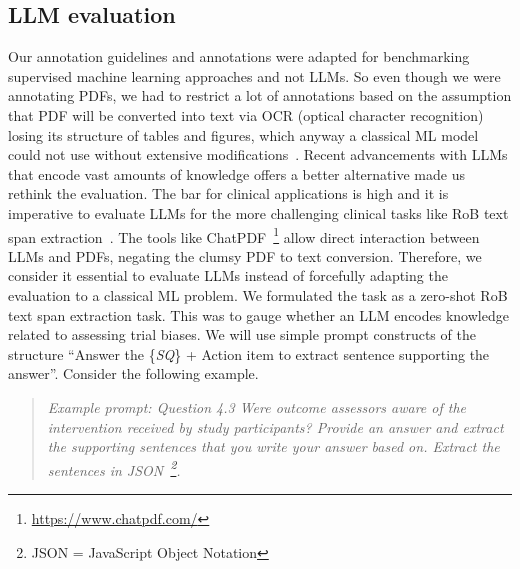 \documentclass[sn-mathphys,Numbered]{sn-jnl}%
\theoremstyle{thmstyleone}%
\theoremstyle{thmstyletwo}%
\theoremstyle{thmstylethree}%
\begin{document}
\subsection{LLM evaluation}
\label{method:llm}
%
Our annotation guidelines and annotations were adapted for benchmarking supervised machine learning approaches and not LLMs.
So even though we were annotating PDFs, we had to restrict a lot of annotations based on the assumption that PDF will be converted into text via OCR (optical character recognition) losing its structure of tables and figures, which anyway a classical ML model could not use without extensive modifications~\cite{li2019figure,li2023uttsr}.
Recent advancements with LLMs that encode vast amounts of knowledge offers a better alternative made us rethink the evaluation.
The bar for clinical applications is high and it is imperative to evaluate LLMs for the more challenging clinical tasks like RoB text span extraction~\cite{singhal2023large}.
The tools like ChatPDF~\footnote{\url{https://www.chatpdf.com/}} allow direct interaction between LLMs and PDFs, negating the clumsy PDF to text conversion.
Therefore, we consider it essential to evaluate LLMs instead of forcefully adapting the evaluation to a classical ML problem.
We formulated the task as a zero-shot RoB text span extraction task.
This was to gauge whether an LLM encodes knowledge related to assessing trial biases.
We will use simple prompt constructs of the structure ``Answer the \{\textit{SQ}\} + Action item to extract sentence supporting the answer''.
Consider the following example.

\begin{quote}
\itshape Example prompt: Question 4.3 Were outcome assessors aware of the intervention received by study participants? Provide an answer and extract the supporting sentences that you write your answer based on. Extract the sentences in JSON~\footnote{JSON = JavaScript Object Notation}.
\end{quote}
\end{document}
